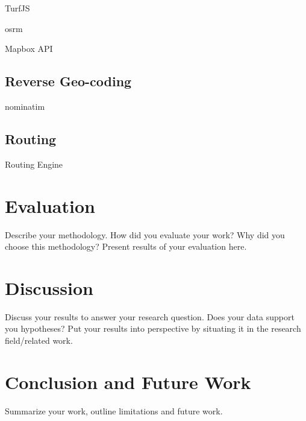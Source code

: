 TurfJS





osrm

Mapbox API



\subsection{Reverse Geo-coding}

nominatim

\subsection{Routing}

Routing Engine

\autocite[]{Delling2012}


\section{}

\section{Evaluation}
Describe your methodology. How did you evaluate your work? Why did you choose this methodology? Present results of your evaluation here.

\section{Discussion}
Discuss your results to answer your research question. Does your data support you hypotheses? Put your results into perspective by situating it in the research field/related work.

\section{Conclusion and Future Work}
Summarize your work, outline limitations and future work. 




